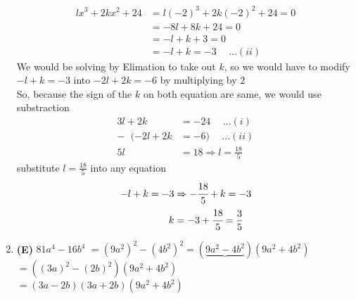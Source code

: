 \begin{multicols}{2}
\begin{enumerate}[label={\textbf{\arabic*.}}]
    \begin{align*}
       lx^3 + 2kx^2 + 24 &= l(-2)^3 + 2k(-2)^2 + 24 = 0 \\
       & = -8l + 8k + 24 = 0 \\ 
       & = -l + k + 3 = 0  \\
       &= -l + k = -3 \hspace{15pt} ...(ii)
    \end{align*}
    We would be solving by Elimation to take out $k$, so we would 
    have to modify $-l + k = -3 $ into $-2l + 2k = -6$ by multiplying by $2$ \\
    So, because the sign of the $k$ on both equation are same, we would use substraction \vspace{-8pt}
    \begin{align*} 
         3l + 2k &= -24 \hspace{15pt}...(i) \\
        - \hspace{7pt} (-2l + 2k &= -6) \hspace{15pt} ...(ii) \\
        5l & = 18 \Rightarrow l = \frac{18}{5} 
    \end{align*} 
    substitute $l = \frac{18}{5}$ into any equation \vspace{-10pt}
    \begin{align*}
      -l + k = -3 &\Rightarrow -\cfrac{18}{5} + k = -3 \\
       k &= -3 + \cfrac{18}{5} =\frac{3}{5} \
    \end{align*}


    \item \textbf{(E)} $81a^4 - 16b^4$ 
    $= (9a^2)^2 - (4b^2)^2 = (\underbrace{9a^2 - 4b^2})(9a^2 + 4b^2)$ \\
    $= ((3a)^2 - (2b)^2)(9a^2 + 4b^2)$ \\
     $= (3a - 2b)(3a + 2b)(9a^2 + 4b^2)$
    

\end{enumerate}
\end{multicols}
